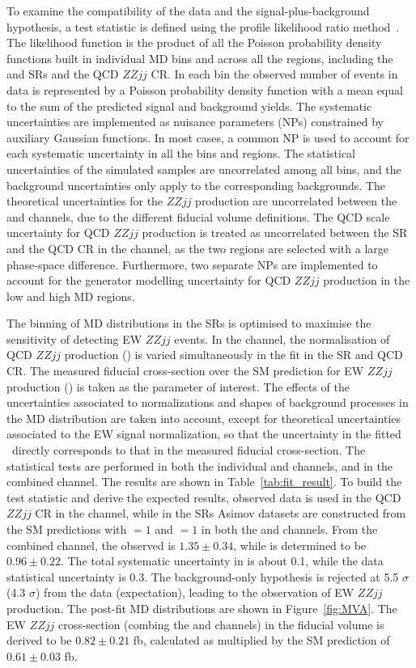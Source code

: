 To examine the compatibility of the data and the signal-plus-background hypothesis, a test statistic is defined using the profile likelihood ratio method~\cite{cowan:Asymptotic2013}.  The likelihood function is the product of all the Poisson probability density functions built in individual MD bins and across all the regions, including the \lllljj and \llvvjj SRs and the \lllljj QCD $ZZjj$ CR. In each bin the observed number of events in data is represented by a Poisson probability density function with a mean equal to the sum of the predicted signal and background yields. The systematic uncertainties are implemented as nuisance parameters (NPs) constrained by auxiliary Gaussian functions. In most cases, a common NP is used to account for each systematic uncertainty in all the bins and regions. The statistical uncertainties of the simulated samples are uncorrelated among all bins, and the background uncertainties only apply to the corresponding backgrounds. The theoretical uncertainties for the $ZZjj$ production are uncorrelated between the \lllljj and \llvvjj channels, due to the different fiducial volume definitions. The QCD scale uncertainty for QCD $ZZjj$ production is treated as uncorrelated between the SR and the QCD CR in the \lllljj channel, as the two regions are selected with a large phase-space difference. Furthermore, two separate NPs are implemented to account for the generator modelling uncertainty for QCD $ZZjj$ production in the low and high MD regions.

The binning of MD distributions in the SRs is optimised to maximise the sensitivity of detecting EW $ZZjj$ events.
In the \lllljj channel, the normalisation of QCD $ZZjj$ production (\muQCD) is varied simultaneously in the fit in the SR and QCD CR.
The measured fiducial cross-section over the SM prediction for EW $ZZjj$ production (\muEW) is taken as the parameter of interest.
The effects of the uncertainties associated to normalizations and shapes of background processes in the MD distribution
are taken into account, except for theoretical uncertainties associated to the EW signal normalization,
so that the uncertainty in the fitted \muEW~directly corresponds to that in the measured fiducial cross-section.
The statistical tests are performed in both the individual \lllljj and \llvvjj channels, and in the combined channel.
The results are shown in Table~\ref{tab:fit_result}. 
To build the test statistic and derive the expected results, observed data is used in the QCD $ZZjj$ CR in the \lllljj channel,
while in the SRs Asimov datasets are constructed from the SM predictions with \muEW $=1$ and \muQCD $=1$ in both the \lllljj and \llvvjj channels.
From the combined channel, the observed \muEW is $1.35\pm0.34$, while \muQCD is determined to be $0.96\pm0.22$.
The total systematic uncertainty in \muEW is about 0.1, while the data statistical uncertainty is 0.3.
The background-only hypothesis is rejected at 5.5 $\sigma$ (4.3 $\sigma$) from the data (expectation), leading to the observation of EW $ZZjj$ production. 
The post-fit MD distributions are shown in Figure~\ref{fig:MVA}.
The EW $ZZjj$ cross-section (combing the \lllljj and \llvvjj channels) in the fiducial volume is derived to be $0.82\pm0.21$ fb, 
calculated as \muEW multiplied by the SM prediction of $0.61 \pm 0.03$ fb.

